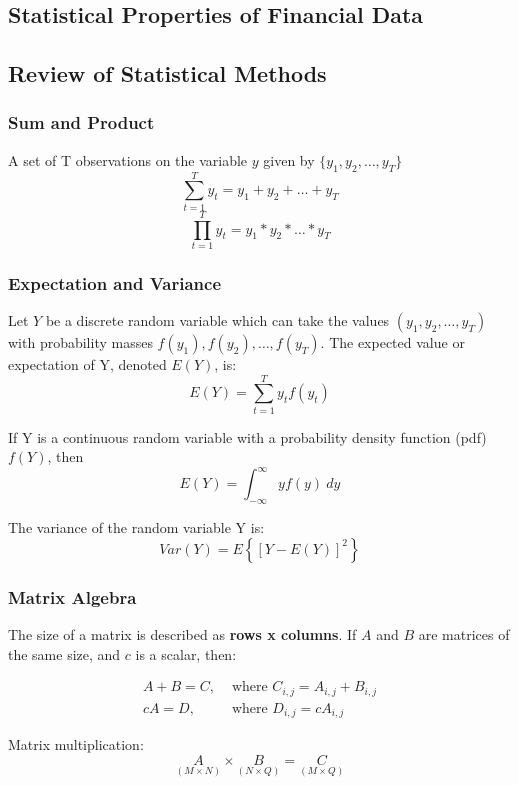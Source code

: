 \documentclass[11pt]{article}
\begin{document}
\subsection{Statistical Properties of Financial Data}

\subsection*{Review of Statistical Methods}

\subsubsection*{Sum and Product}

A set of T observations on the variable $y$ given by $\{ y_1, y_2, \dots, y_T \}$
\[\sum_{t=1}^T y_t = y_1 + y_2 + \dots + y_T\]
\[\prod_{t=1}^{T} y_t = y_1 * y_2 * \dots * y_T\]


\subsubsection*{Expectation and Variance}

Let $Y$ be a discrete random variable which can take the values $(y_1, y_2, \ldots, y_T)$ with probability masses $f(y_1), f(y_2), \ldots, f(y_T)$. The expected value or expectation of Y, denoted $E(Y)$, is:
\[ E(Y) = \sum_{t=1}^T y_t f(y_t)\]

If Y is a continuous random variable with a probability density function (pdf) $f(Y)$, then 
\[E(Y) = \int_{-\infty}^\infty yf(y)\ dy\]

The variance of the random variable Y is:
\[ Var(Y) = E\left\{ [Y-E(Y)]^2 \right\} \]
 
\subsubsection*{Matrix Algebra}

The size of a matrix is described as \textbf{rows x columns}. If $A$ and $B$ are matrices of the same size, and $c$ is a scalar, then:

\begin{align*}
    A + B = C, &\text{ where } C_{i,j} = A_{i,j} + B_{i,j} \\
    cA = D, &\text{ where } D_{i,j} = cA_{i,j}
\end{align*}

Matrix multiplication:
\begin{equation*}
\underset{(M \times N)}{A} \times \underset{(N \times Q)}{B}=\underset{(M \times Q)}{C}
\end{equation*}
\end{document}
